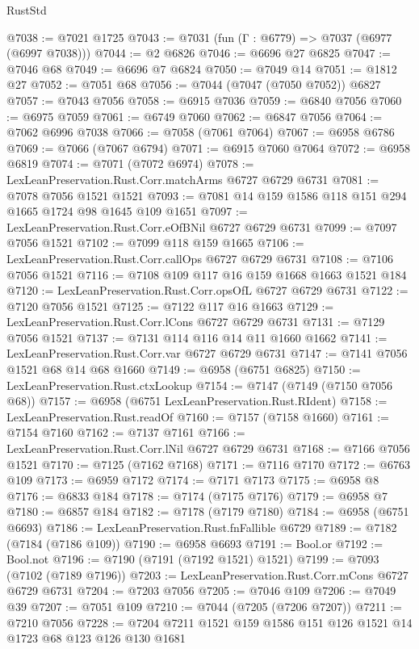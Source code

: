 \begin{lexlean}{RustStd}
\begin{coremodule}
@7038 := @7021 @1725
@7043 := @7031 (fun (Γ : @6779) => @7037 (@6977 (@6997 @7038)))
@7044 := @2 @6826
@7046 := @6696 @27 @6825
@7047 := @7046 @68
@7049 := @6696 @7 @6824
@7050 := @7049 @14
@7051 := @1812 @27
@7052 := @7051 @68
@7056 := @7044 (@7047 (@7050 @7052)) @6827
@7057 := @7043 @7056
@7058 := @6915 @7036
@7059 := @6840 @7056
@7060 := @6975 @7059
@7061 := @6749 @7060
@7062 := @6847 @7056
@7064 := @7062 @6996 @7038
@7066 := @7058 (@7061 @7064)
@7067 := @6958 @6786
@7069 := @7066 (@7067 @6794)
@7071 := @6915 @7060 @7064
@7072 := @6958 @6819
@7074 := @7071 (@7072 @6974)
@7078 := LexLeanPreservation.Rust.Corr.matchArms @6727 @6729 @6731
@7081 := @7078 @7056 @1521 @1521
@7093 := @7081 @14 @159 @1586 @118 @151 @294 @1665 @1724 @98 @1645 @109 @1651
@7097 := LexLeanPreservation.Rust.Corr.eOfBNil @6727 @6729 @6731
@7099 := @7097 @7056 @1521
@7102 := @7099 @118 @159 @1665
@7106 := LexLeanPreservation.Rust.Corr.callOps @6727 @6729 @6731
@7108 := @7106 @7056 @1521
@7116 := @7108 @109 @117 @16 @159 @1668 @1663 @1521 @184
@7120 := LexLeanPreservation.Rust.Corr.opsOfL @6727 @6729 @6731
@7122 := @7120 @7056 @1521
@7125 := @7122 @117 @16 @1663
@7129 := LexLeanPreservation.Rust.Corr.lCons @6727 @6729 @6731
@7131 := @7129 @7056 @1521
@7137 := @7131 @114 @116 @14 @11 @1660 @1662
@7141 := LexLeanPreservation.Rust.Corr.var @6727 @6729 @6731
@7147 := @7141 @7056 @1521 @68 @14 @68 @1660
@7149 := @6958 (@6751 @6825)
@7150 := LexLeanPreservation.Rust.ctxLookup
@7154 := @7147 (@7149 (@7150 @7056 @68))
@7157 := @6958 (@6751 LexLeanPreservation.Rust.RIdent)
@7158 := LexLeanPreservation.Rust.readOf
@7160 := @7157 (@7158 @1660)
@7161 := @7154 @7160
@7162 := @7137 @7161
@7166 := LexLeanPreservation.Rust.Corr.lNil @6727 @6729 @6731
@7168 := @7166 @7056 @1521
@7170 := @7125 (@7162 @7168)
@7171 := @7116 @7170
@7172 := @6763 @109
@7173 := @6959 @7172
@7174 := @7171 @7173
@7175 := @6958 @8
@7176 := @6833 @184
@7178 := @7174 (@7175 @7176)
@7179 := @6958 @7
@7180 := @6857 @184
@7182 := @7178 (@7179 @7180)
@7184 := @6958 (@6751 @6693)
@7186 := LexLeanPreservation.Rust.fnFallible @6729
@7189 := @7182 (@7184 (@7186 @109))
@7190 := @6958 @6693
@7191 := Bool.or
@7192 := Bool.not
@7196 := @7190 (@7191 (@7192 @1521) @1521)
@7199 := @7093 (@7102 (@7189 @7196))
@7203 := LexLeanPreservation.Rust.Corr.mCons @6727 @6729 @6731
@7204 := @7203 @7056
@7205 := @7046 @109
@7206 := @7049 @39
@7207 := @7051 @109
@7210 := @7044 (@7205 (@7206 @7207))
@7211 := @7210 @7056
@7228 := @7204
    @7211
    @1521
    @159
    @1586
    @151
    @126
    @1521
    @14
    @1723
    @68
    @123
    @126
    @130
    @1681

\end{coremodule}
\end{lexlean}
